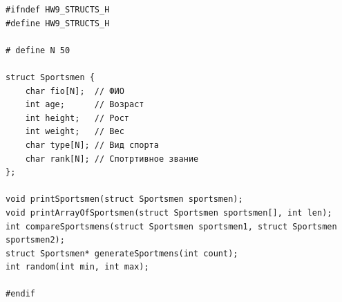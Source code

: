 \documentclass[12pt]{article}
\begin{document}
\begin{lstlisting}[label=structs.h, caption=structs.h]
#ifndef HW9_STRUCTS_H
#define HW9_STRUCTS_H

# define N 50

struct Sportsmen {
    char fio[N];  // ФИО
    int age;      // Возраст
    int height;   // Рост
    int weight;   // Вес
    char type[N]; // Вид спорта
    char rank[N]; // Спотртивное звание
};

void printSportsmen(struct Sportsmen sportsmen);
void printArrayOfSportsmen(struct Sportsmen sportsmen[], int len);
int compareSportsmens(struct Sportsmen sportsmen1, struct Sportsmen sportsmen2);
struct Sportsmen* generateSportmens(int count);
int random(int min, int max);

#endif
\end{lstlisting} 

\newpage
\end{document}
